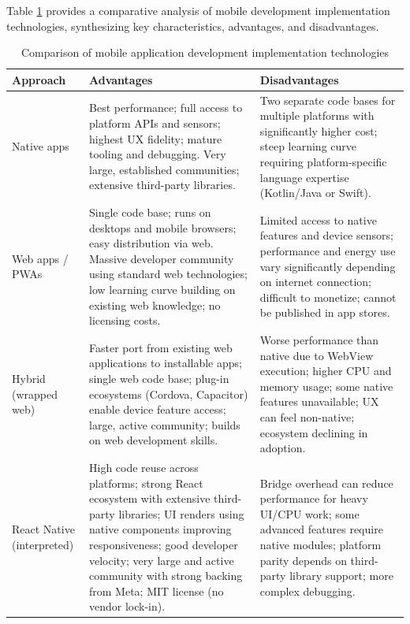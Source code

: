 Table \ref{tab:approaches-comprehensive} provides a comparative analysis of mobile development implementation technologies, synthesizing key characteristics, advantages, and disadvantages.
\begin{table}[ht]
	\centering
	
	\small
	\renewcommand{\arraystretch}{1.4}
	\setlength{\tabcolsep}{8pt}
	\caption{Comparison of mobile application development implementation technologies \cite{Khachouch2020, 10667693, Janakaraj2025}}
	\label{tab:approaches-comprehensive}
	\begin{tabularx}{\textwidth}{|p{3.2cm}|X|X|}
		\hline
		\textbf{Approach} & \textbf{Advantages} & \textbf{Disadvantages} \\ \hline
		
		Native apps & 
		Best performance; full access to platform APIs and sensors; highest UX fidelity; mature tooling and debugging. Very large, established communities; extensive third-party libraries. & 
		Two separate code bases for multiple platforms with significantly higher cost; steep learning curve requiring platform-specific language expertise (Kotlin/Java or Swift). \\ \hline
		
		Web apps / PWAs & 
		Single code base; runs on desktops and mobile browsers; easy distribution via web. Massive developer community using standard web technologies; low learning curve building on existing web knowledge; no licensing costs. & 
		Limited access to native features and device sensors; performance and energy use vary significantly depending on internet connection; difficult to monetize; cannot be published in app stores. \\ \hline
		
		Hybrid (wrapped web) & 
		Faster port from existing web applications to installable apps; single web code base; plug-in ecosystems (Cordova, Capacitor) enable device feature access; large, active community; builds on web development skills. & 
		Worse performance than native due to WebView execution; higher CPU and memory usage; some native features unavailable; UX can feel non-native; ecosystem declining in adoption. \\ \hline
		
		React Native (interpreted) & 
		High code reuse across platforms; strong React ecosystem with extensive third-party libraries; UI renders using native components improving responsiveness; good developer velocity; very large and active community with strong backing from Meta; MIT license (no vendor lock-in). & 
		Bridge overhead can reduce performance for heavy UI/CPU work; some advanced features require native modules; platform parity depends on third-party library support; more complex debugging. \\ \hline
		

\end{tabularx}
\end{table}
